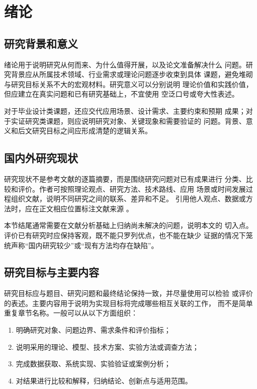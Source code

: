 \chapter{绪论}

\section{研究背景和意义}

绪论用于说明研究从何而来、为什么值得开展，以及论文准备解决什么
问题。研究背景应从所属技术领域、行业需求或理论问题逐步收束到具体
课题，避免堆砌与研究目标关系不大的宏观材料。研究意义可以分别说明
理论价值和实践价值，但应建立在真实问题和已有研究基础上，不宜使用
空泛口号或夸大性表述。

对于毕业设计类课题，还应交代应用场景、设计需求、主要约束和预期
成果；对于实证研究类课题，则应说明研究对象、关键现象和需要验证的
问题。背景、意义和后文研究目标之间应形成清楚的逻辑关系。

\section{国内外研究现状}

研究现状不是参考文献的逐篇摘要，而是围绕研究问题对已有成果进行
分类、比较和评价。作者可按照理论观点、研究方法、技术路线、应用
场景或时间发展过程组织文献，说明不同研究之间的联系、差异和不足。
引用他人观点、数据或方法时，应在正文相应位置标注文献来源
\cite{liu1988vortex,wu2010film,sui2015edm}。

本节结尾通常需要在文献分析基础上归纳尚未解决的问题，说明本文的
切入点。评价已有研究时应保持客观，既不能只罗列优点，也不能在缺少
证据的情况下笼统声称“国内研究较少”或“现有方法均存在缺陷”。

\section{研究目标与主要内容}

研究目标应与题目、研究问题和最终结论保持一致，并尽量使用可以检验
或评价的表述。主要内容用于说明为实现目标将完成哪些相互关联的工作，
而不是简单重复章节名称。一般可以从以下方面组织：

\begin{enumerate}
  \item 明确研究对象、问题边界、需求条件和评价指标；
  \item 说明采用的理论、模型、技术方案、实验方法或调查方法；
  \item 完成数据获取、系统实现、实验验证或案例分析；
  \item 对结果进行比较和解释，归纳结论、创新点与适用范围。
\end{enumerate}

